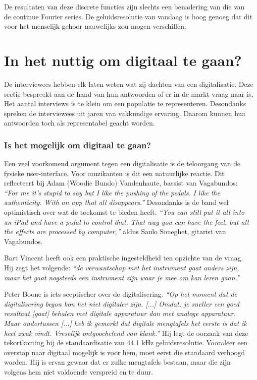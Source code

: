 De resultaten van deze discrete functies zijn slechts een benadering van die van de continue Fourier series. \autocite{fourier} De geluidsresolutie van vandaag is hoog genoeg dat dit voor het menselijk gehoor nauwelijks zou mogen verschillen. \autocite{vagabundos}

\section{In het nuttig om digitaal te gaan?}

De interviewees hebben elk laten weten wat zij dachten van een digitalisatie. Deze sectie bespreekt aan de hand van hun antwoorden of er in de markt vraag naar is. Het aantal interviews is te klein om een populatie te representeren. Desondanks spreken de interviewees uit jaren van vakkundige ervaring. Daarom kunnen hun antwoorden toch als representabel geacht worden.

\subsubsection{Is het mogelijk om digitaal te gaan?}

Een veel voorkomend argument tegen een digitalisatie is de teloorgang van de fysieke user-interface. Voor muzikanten is dit een natuurlijke reactie. Dit reflecteert bij Adam (Woodie Bundo) Vandenhaute, bassist van Vagabundos: \textit{``For me it's stupid to say but I like the pushing of the pedals. I like the authenticity. With an app that all disappears.''} \autocite{vagabundos} Desondanks is de band wel optimistisch over wat de toekomst te bieden heeft. \textit{``You can still put it all into an iPad and have a pedal to control that. That way you can have the feel, but all the effects are processed by computer,''} aldus Saulo Soneghet, gitarist van Vagabundos. \autocite{vagabundos}

Bart Vincent heeft ook een praktische ingesteldheid ten opzichte van de vraag. Hij zegt het volgende: \textit{``de verwantschap met het instrument gaat anders zijn, maar het gaat nogsteeds een instrument zijn waar je mee om kan leren gaan.''} \autocite{bartvincent}

Peter Boone is iets sceptischer over de digitalisering. \textit{``Op het moment dat de digitalisering begon kon het niet digitaler zijn. [...] Omdat, je sneller een goed resultaat [gaat] behalen met digitale apparatuur dan met analoge apparatuur. Maar ondertussen [...] heb ik gemerkt dat digitale mengtafels het eerste is dat ik heel zwak vindt. Vreselijk ontgoochelend van klank.''} \autocite{peterboone} Hij legt de oorzaak van deze tekortkoming bij de standaardisatie van 44.1 kHz geluidsresolutie. Vooraleer een overstap naar digitaal mogelijk is voor hem, moet eerst die standaard verhoogd worden. Hij is ervan gewaar dat er zulke mengtafels bestaan, maar die zijn volgens hem niet voldoende verspreid en te duur. \autocite{peterboone}

